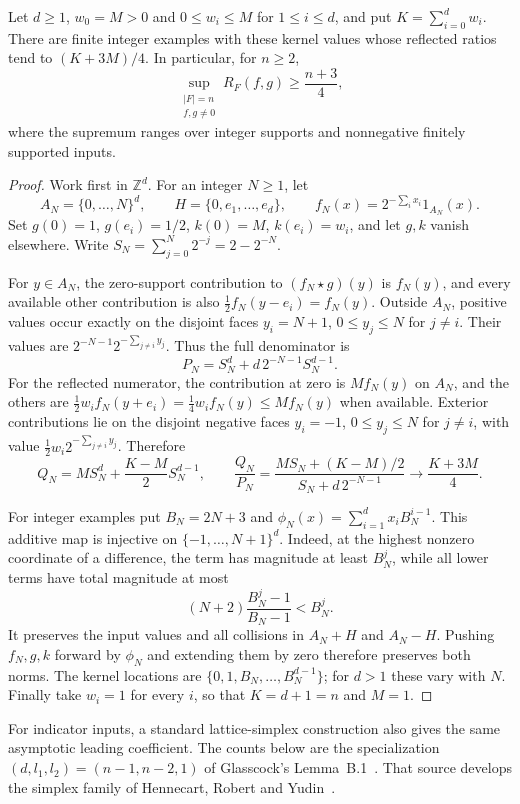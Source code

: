 \begin{proposition}\label{prop:geometric-product}
Let $d\ge1$, $w_0=M>0$ and $0\le w_i\le M$ for $1\le i\le d$,
and put $K=\sum_{i=0}^d w_i$. There are finite integer examples with
these kernel values whose reflected ratios tend to $(K+3M)/4$.
In particular, for $n\ge2$,
\[
 \sup_{\substack{|F|=n\\f,g\ne0}}R_F(f,g)\ge\frac{n+3}{4},
\]
where the supremum ranges over integer supports and nonnegative finitely
supported inputs.
\end{proposition}
\begin{proof}
Work first in $\mathbb Z^d$. For an integer $N\ge1$, let
\[
 A_N=\{0,\ldots,N\}^d,\qquad H=\{0,e_1,\ldots,e_d\},\qquad
 f_N(x)=2^{-\sum_i x_i}1_{A_N}(x).
\]
Set $g(0)=1$, $g(e_i)=1/2$, $k(0)=M$, $k(e_i)=w_i$, and let
$g,k$ vanish elsewhere. Write
$S_N=\sum_{j=0}^N2^{-j}=2-2^{-N}$.

For $y\in A_N$, the zero-support contribution to $(f_N\star g)(y)$
is $f_N(y)$, and every available other contribution is also
$\tfrac12f_N(y-e_i)=f_N(y)$. Outside $A_N$, positive values occur
exactly on the disjoint faces
$y_i=N+1$, $0\le y_j\le N$ for $j\ne i$. Their values are
$2^{-N-1}2^{-\sum_{j\ne i}y_j}$. Thus the full denominator is
\[
 P_N=S_N^d+d\,2^{-N-1}S_N^{d-1}.
\]
For the reflected numerator, the contribution at zero is $Mf_N(y)$
on $A_N$, and the others are
$\tfrac12w_i f_N(y+e_i)=\tfrac14w_i f_N(y)\le Mf_N(y)$
when available. Exterior contributions lie on the disjoint negative
faces $y_i=-1$, $0\le y_j\le N$ for $j\ne i$, with value
$\tfrac12w_i2^{-\sum_{j\ne i}y_j}$. Therefore
\[
 Q_N=MS_N^d+\frac{K-M}{2}S_N^{d-1},\qquad
 \frac{Q_N}{P_N}
 =\frac{MS_N+(K-M)/2}{S_N+d\,2^{-N-1}}
 \longrightarrow\frac{K+3M}{4}.
\]

For integer examples put $B_N=2N+3$ and
$\phi_N(x)=\sum_{i=1}^d x_iB_N^{i-1}$.
This additive map is injective on $\{-1,\ldots,N+1\}^d$.
Indeed, at the highest nonzero coordinate of a difference, the term
has magnitude at least $B_N^j$, while all lower terms have total
magnitude at most
\[
 (N+2)\frac{B_N^j-1}{B_N-1}<B_N^j.
\]
It preserves the input values and all collisions in $A_N+H$ and
$A_N-H$. Pushing $f_N,g,k$ forward by $\phi_N$ and extending them by
zero therefore preserves both norms. The kernel locations are
$\{0,1,B_N,\ldots,B_N^{d-1}\}$; for $d>1$ these vary with $N$.
Finally take $w_i=1$ for every $i$, so that $K=d+1=n$ and $M=1$.
\end{proof}

For indicator inputs, a standard lattice-simplex construction also gives
the same asymptotic leading coefficient. The counts below are the
specialization $(d,l_1,l_2)=(n-1,n-2,1)$ of Glasscock's
Lemma~B.1~\cite[pp.~37--38]{glasscock}. That source develops the simplex
family of Hennecart, Robert and Yudin~\cite[Section~3]{hry}.

